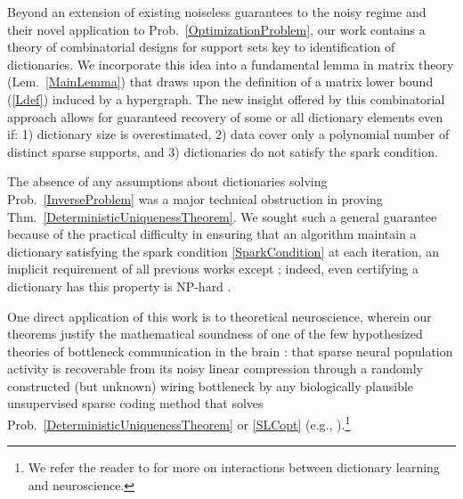 \documentclass[journal, twocolumn]{IEEEtran}
\begin{document}




Beyond an extension of existing noiseless guarantees \cite{Hillar15} to the noisy regime and their novel application to Prob.~\ref{OptimizationProblem}, our work contains a theory of combinatorial designs for support sets key to identification of dictionaries. We incorporate this idea into a fundamental lemma in matrix theory (Lem.~\ref{MainLemma}) that draws upon the definition of a matrix lower bound (\ref{Ldef}) induced by a hypergraph. The new insight offered by this combinatorial approach allows for guaranteed recovery of some or all dictionary elements even if: 1) dictionary size is overestimated, 2) data cover only a polynomial number of distinct sparse supports, and 3) dictionaries do not satisfy the spark condition. 

The absence of any assumptions about dictionaries solving Prob.~\ref{InverseProblem} was a major technical obstruction in proving Thm.~\ref{DeterministicUniquenessTheorem}. We sought such a general guarantee because of the practical difficulty in ensuring that an algorithm maintain a dictionary satisfying the spark condition \eqref{SparkCondition} at each iteration, an implicit requirement of all previous works except \cite{Hillar15}; indeed, even certifying a dictionary has this property is NP-hard \cite{tillmann2014computational}.

One direct application of this work is to theoretical neuroscience, wherein our theorems justify the mathematical soundness of one of the few hypothesized theories of bottleneck communication in the brain \cite{Isely10}: that sparse neural population activity is recoverable from its noisy linear compression through a randomly constructed (but unknown) wiring bottleneck by any biologically plausible unsupervised sparse coding method that solves Prob.~\ref{DeterministicUniquenessTheorem} or \ref{SLCopt} (e.g., \cite{rehnsommer2007, rozell2007neurally, pehlevan2015normative}).\footnote{We refer the reader to \cite{ganguli2012compressed} for more on interactions between dictionary learning and neuroscience.}
\end{document}
